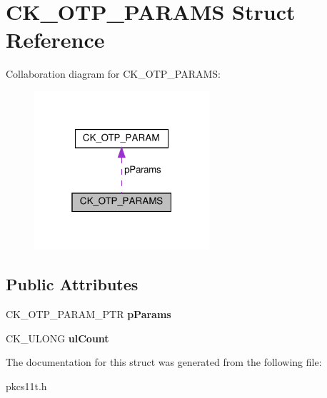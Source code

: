 \hypertarget{struct_c_k___o_t_p___p_a_r_a_m_s}{}\section{C\+K\+\_\+\+O\+T\+P\+\_\+\+P\+A\+R\+A\+MS Struct Reference}
\label{struct_c_k___o_t_p___p_a_r_a_m_s}


Collaboration diagram for C\+K\+\_\+\+O\+T\+P\+\_\+\+P\+A\+R\+A\+MS\+:
\nopagebreak
\begin{figure}[H]
\begin{center}
\leavevmode
\includegraphics[width=184pt]{struct_c_k___o_t_p___p_a_r_a_m_s__coll__graph}
\end{center}
\end{figure}
\subsection*{Public Attributes}
\begin{DoxyCompactItemize}
\item 
\mbox{\label{struct_c_k___o_t_p___p_a_r_a_m_s_a0c1c31bc572747df887a0f2fd470829b}} 
C\+K\+\_\+\+O\+T\+P\+\_\+\+P\+A\+R\+A\+M\+\_\+\+P\+TR {\bfseries p\+Params}
\item 
\mbox{\label{struct_c_k___o_t_p___p_a_r_a_m_s_add62565e22aa0a71327114091fbaa2d4}} 
C\+K\+\_\+\+U\+L\+O\+NG {\bfseries ul\+Count}
\end{DoxyCompactItemize}


The documentation for this struct was generated from the following file\+:\begin{DoxyCompactItemize}
\item 
pkcs11t.\+h\end{DoxyCompactItemize}
